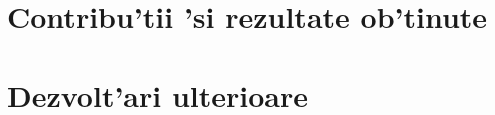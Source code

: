\documentclass[12pt,a4paper,twoside]{report}
\begin{document}
\section{Contribu'tii 'si rezultate ob'tinute}
\section{Dezvolt'ari ulterioare}


 


\end{document}
